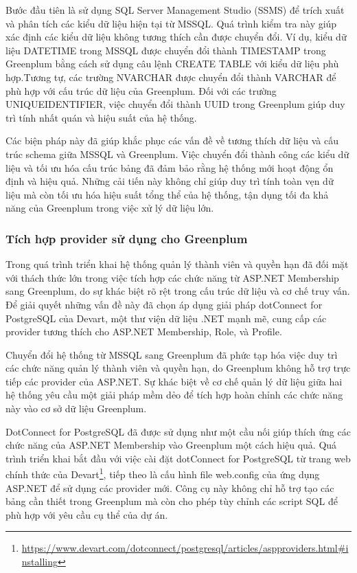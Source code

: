 \documentclass[14pt]{article}
\begin{document}
Bước đầu tiên là sử dụng SQL Server Management Studio (SSMS) để trích xuất và phân tích các kiểu dữ liệu hiện tại từ MSSQL. Quá trình kiểm tra này giúp xác định các kiểu dữ liệu không tương thích cần được chuyển đổi. Ví dụ, kiểu dữ liệu DATETIME trong MSSQL được chuyển đổi thành TIMESTAMP trong Greenplum bằng cách sử dụng câu lệnh CREATE TABLE với kiểu dữ liệu phù hợp.Tương tự, các trường NVARCHAR được chuyển đổi thành VARCHAR để phù hợp với cấu trúc dữ liệu của Greenplum. Đối với các trường UNIQUEIDENTIFIER, việc chuyển đổi thành UUID trong Greenplum giúp duy trì tính nhất quán và hiệu suất của hệ thống.

Các biện pháp này đã giúp khắc phục các vấn đề về tương thích dữ liệu và cấu trúc schema giữa MSSQL và Greenplum. Việc chuyển đổi thành công các kiểu dữ liệu và tối ưu hóa cấu trúc bảng đã đảm bảo rằng hệ thống mới hoạt động ổn định và hiệu quả. Những cải tiến này không chỉ giúp duy trì tính toàn vẹn dữ liệu mà còn tối ưu hóa hiệu suất tổng thể của hệ thống, tận dụng tối đa khả năng của Greenplum trong việc xử lý dữ liệu lớn.

\subsubsection{Tích hợp provider sử dụng cho Greenplum}

Trong quá trình triển khai hệ thống quản lý thành viên và quyền hạn đã đối mặt với thách thức lớn trong việc tích hợp các chức năng từ ASP.NET Membership sang Greenplum, do sự khác biệt rõ rệt trong cấu trúc dữ liệu và cơ chế truy vấn. Để giải quyết những vấn đề này đã chọn áp dụng giải pháp dotConnect for PostgreSQL của Devart, một thư viện dữ liệu .NET mạnh mẽ, cung cấp các provider tương thích cho ASP.NET Membership, Role, và Profile.


Chuyển đổi hệ thống từ MSSQL sang Greenplum đã phức tạp hóa việc duy trì các chức năng quản lý thành viên và quyền hạn, do Greenplum không hỗ trợ trực tiếp các provider của ASP.NET. Sự khác biệt về cơ chế quản lý dữ liệu giữa hai hệ thống yêu cầu một giải pháp mềm dẻo để tích hợp hoàn chỉnh các chức năng này vào cơ sở dữ liệu Greenplum.

DotConnect for PostgreSQL đã được sử dụng như một cầu nối giúp thích ứng các chức năng của ASP.NET Membership vào Greenplum một cách hiệu quả. Quá trình triển khai bắt đầu với việc cài đặt dotConnect for PostgreSQL từ trang web chính thức của Devart\footnote{\url{https://www.devart.com/dotconnect/postgresql/articles/aspproviders.html#installing}}, tiếp theo là cấu hình file web.config của ứng dụng ASP.NET để sử dụng các provider mới. Công cụ này không chỉ hỗ trợ tạo các bảng cần thiết trong Greenplum mà còn cho phép tùy chỉnh các script SQL để phù hợp với yêu cầu cụ thể của dự án.
\end{document}

